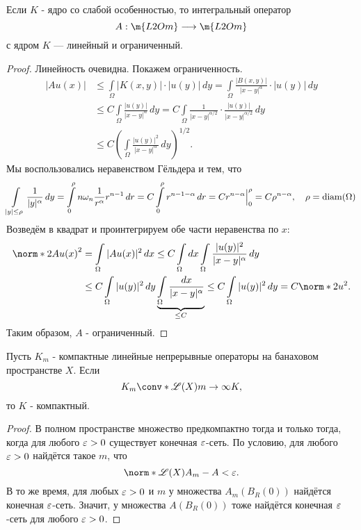 \begin{theorem} Если $K$ - ядро со слабой особенностью, то интегральный оператор
$$A: \m{L2Om} \longrightarrow \m{L2Om}$$
с ядром $K$ --- линейный и ограниченный.
\end{theorem}
\begin{proof}
Линейность очевидна. Покажем ограниченность.
\begin{align*}
|Au(x)| &\leq \int \limits_\Omega |K(x,y)| \cdot |u(y)| \, dy = \int \limits_\Omega \frac {|B(x,y)|} {|x-y|^\alpha} \cdot |u(y)| \, dy \\
&\leq C \int \limits_\Omega \frac {|u(y)|} {|x-y|^\alpha} \, dy = C \int \limits_\Omega \frac {1} {|x-y|^{\alpha/2}} \cdot \frac {|u(y)|} {|x-y|^{\alpha/2}} \, dy \\ 
&\leq C \left( \int \limits_\Omega \frac {|u(y)|^2}{|x-y|^\alpha} \, dy \right)^{1/2}.
\end{align*}
Мы воспользовались неравенством Гёльдера и тем, что 
$$\int \limits_{|y| \leq \rho} \frac {1} {|y|^\alpha} \, dy = \int \limits_0^\rho n \omega_n \frac {1} {r^\alpha} r^{n-1} \, dr  = C \int \limits_0^\rho r^{n-1-\alpha} \, dr = C r^{n-\alpha} \Big\rvert_0^\rho = C \rho^{n-\alpha}, \quad \rho = \operatorname{diam}(\Omega)$$
Возведём в квадрат и проинтегрируем обе части неравенства по $x$:
\begin{align*}
\norm*{2}{Au(x)}^2 &= \int \limits_\Omega |Au(x)|^2 \, dx \leq C \int \limits_\Omega dx \int \limits_\Omega \frac {|u(y)|^2} {|x-y|^\alpha} \, dy \\
&\leq C \int \limits_\Omega |u(y)|^2 \, dy \underbrace {\int \limits_\Omega \frac {dx} {|x-y|^\alpha} }_{\leq C} \leq C \int \limits_\Omega |u(y)|^2 \, dy = C \norm*{2}{u}^2.  
\end{align*}
Таким образом, $A$ - ограниченный.

\end{proof}


\begin{note}
Пусть $K_m$ - компактные линейные непрерывные операторы на банаховом пространстве $X$. Если
$$ K_m \conv*{\mathscr{L} (X)}{m \to \infty} K,$$
то $K$ - компактный.
\end{note}
\begin{proof}
В полном пространстве множество предкомпактно тогда и только тогда, когда для любого $\varepsilon > 0$ существует конечная $\varepsilon$-сеть. По условию, для любого $\varepsilon > 0$ найдётся такое $m$, что
$$ \norm*{\mathscr{L} (X)}{A_m - A} < \eps.$$
В то же время, для любых $\varepsilon > 0$ и $m$ у множества $A_m (B_R(0))$ найдётся конечная $\varepsilon$-сеть. Значит, у множества $A(B_R(0))$ тоже найдётся конечная $\varepsilon$-сеть для любого $\varepsilon > 0$. 

\end{proof}

